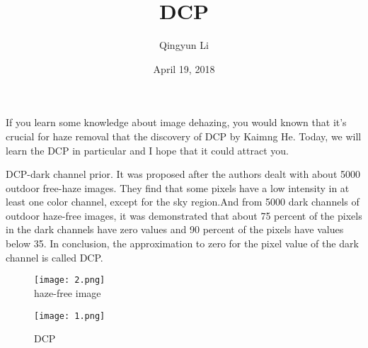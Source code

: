 \documentclass{article}
\author{Qingyun Li}
\date{April 19, 2018}
\title{DCP}
\begin{document}
\maketitle
 \par If you learn some knowledge about image dehazing, you would known that it's crucial for haze removal that the discovery of DCP by Kaimng He. Today, we will learn the DCP in particular and I hope that it could attract you.
 \par DCP-dark channel prior. It was proposed after the authors dealt with about 5000 outdoor free-haze images. They find that some pixels have a low intensity in at least one color channel, except for the sky region.And from 5000 dark channels of outdoor haze-free images, it was demonstrated that about 75 percent of the pixels in the dark channels have zero values and 90 percent of the pixels have values below 35. In conclusion, the approximation to zero for the pixel value of the dark channel is called DCP.
\begin{figure}[htbp]
\begin{minipage}{0.5\linewidth}
\centering{}
\texttt{[image: 2.png]}\\
\caption{haze-free image}\label{image} 
\end{minipage}
\hfill
\begin{minipage}{0.5\linewidth}
\centering{}
\texttt{[image: 1.png]}\\
\caption{DCP}\label{DCP}
\end{minipage} 
\end{figure}
\end{document}
